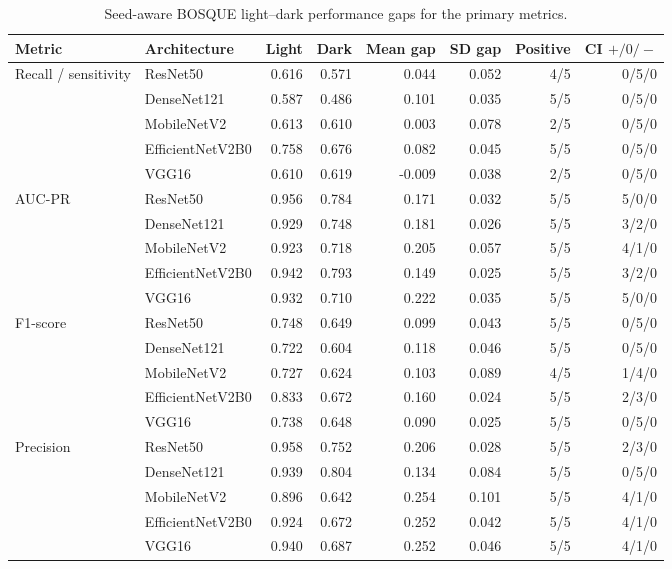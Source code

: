 \begin{table}[h!]
\centering
\scriptsize
\caption{Seed-aware BOSQUE light--dark performance gaps for the primary metrics.}
\label{tab:seed-aware-light-dark-gaps}
\setlength{\tabcolsep}{3.5pt}
\renewcommand{\arraystretch}{1.08}
\begin{tabular}{llrrrrrr}
\toprule
\textbf{Metric} & \textbf{Architecture} & \textbf{Light} & \textbf{Dark} & \textbf{Mean gap} & \textbf{SD gap} & \textbf{Positive} & \textbf{CI $+/0/-$} \\
\midrule
Recall / sensitivity & ResNet50 & 0.616 & 0.571 & 0.044 & 0.052 & 4/5 & 0/5/0 \\
 & DenseNet121 & 0.587 & 0.486 & 0.101 & 0.035 & 5/5 & 0/5/0 \\
 & MobileNetV2 & 0.613 & 0.610 & 0.003 & 0.078 & 2/5 & 0/5/0 \\
 & EfficientNetV2B0 & 0.758 & 0.676 & 0.082 & 0.045 & 5/5 & 0/5/0 \\
 & VGG16 & 0.610 & 0.619 & -0.009 & 0.038 & 2/5 & 0/5/0 \\
\addlinespace
AUC-PR & ResNet50 & 0.956 & 0.784 & 0.171 & 0.032 & 5/5 & 5/0/0 \\
 & DenseNet121 & 0.929 & 0.748 & 0.181 & 0.026 & 5/5 & 3/2/0 \\
 & MobileNetV2 & 0.923 & 0.718 & 0.205 & 0.057 & 5/5 & 4/1/0 \\
 & EfficientNetV2B0 & 0.942 & 0.793 & 0.149 & 0.025 & 5/5 & 3/2/0 \\
 & VGG16 & 0.932 & 0.710 & 0.222 & 0.035 & 5/5 & 5/0/0 \\
\addlinespace
F1-score & ResNet50 & 0.748 & 0.649 & 0.099 & 0.043 & 5/5 & 0/5/0 \\
 & DenseNet121 & 0.722 & 0.604 & 0.118 & 0.046 & 5/5 & 0/5/0 \\
 & MobileNetV2 & 0.727 & 0.624 & 0.103 & 0.089 & 4/5 & 1/4/0 \\
 & EfficientNetV2B0 & 0.833 & 0.672 & 0.160 & 0.024 & 5/5 & 2/3/0 \\
 & VGG16 & 0.738 & 0.648 & 0.090 & 0.025 & 5/5 & 0/5/0 \\
\addlinespace
Precision & ResNet50 & 0.958 & 0.752 & 0.206 & 0.028 & 5/5 & 2/3/0 \\
 & DenseNet121 & 0.939 & 0.804 & 0.134 & 0.084 & 5/5 & 0/5/0 \\
 & MobileNetV2 & 0.896 & 0.642 & 0.254 & 0.101 & 5/5 & 4/1/0 \\
 & EfficientNetV2B0 & 0.924 & 0.672 & 0.252 & 0.042 & 5/5 & 4/1/0 \\
 & VGG16 & 0.940 & 0.687 & 0.252 & 0.046 & 5/5 & 4/1/0 \\

\end{tabular}
\end{table}

